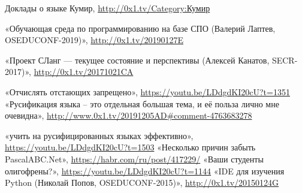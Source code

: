 ﻿\documentclass[a4paper,12pt]{article}
\begin{document}
\begin{thebibliography}{9}
     Доклады о языке Кумир, \url{http://0x1.tv/Category:Кумир}

     «Обучающая среда по программированию на базе СПО (Валерий Лаптев, OSEDUCONF-2019)», \url{http://0x1.tv/20190127E}

     «Проект СЛанг — текущее состояние и перспективы (Алексей Канатов, SECR-2017)», \url{http://0x1.tv/20171021CA}

     «Отчислять отстающих запрещено», \url{https://youtu.be/LDdgdKI20cU?t=1351}
     «Русификация языка -- это отдельная большая тема, и её польза лично мне очевидна», \url{http://www.0x1.tv/20191205AD#comment-4763683278}

     «учить на русифицированных
    языках эффективно», \url{https://youtu.be/LDdgdKI20cU?t=1503}
     «Несколько причин забыть PascalABC.Net», \url{https://habr.com/ru/post/417229/}
     «Ваши студенты олигофрены?», \url{https://youtu.be/LDdgdKI20cU?t=1144}
     «IDE для изучения Python (Николай Попов, OSEDUCONF-2015)», \url{http://0x1.tv/20150124G}
\end{thebibliography}
\end{document}
